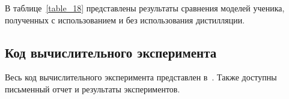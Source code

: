 В таблице~\ref{table_18} представлены результаты сравнения моделей ученика, полученных с использованием и без использования дистилляции.

\subsection{Код вычислительного эксперимента}
Весь код вычислительного эксперимента представлен в~\cite{Github}. Также доступны письменный отчет и результаты экспериментов.